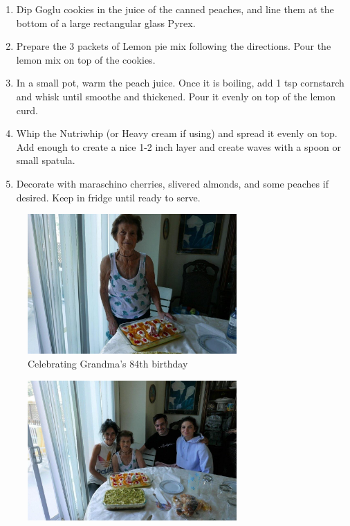 \begin{enumerate}
    \item Dip Goglu cookies in the juice of the canned peaches, and line them at the bottom of a large rectangular glass Pyrex.
    \item Prepare the 3 packets of Lemon pie mix following the directions. Pour the lemon mix on top of the cookies.
    \item In a small pot, warm the peach juice. Once it is boiling, add 1 tsp cornstarch and whisk until smoothe and thickened. Pour it evenly on top of the lemon curd.
    \item Whip the Nutriwhip (or Heavy cream if using) and spread it evenly on top. Add enough to create a nice 1-2 inch layer and create waves with a spoon or small spatula. 
    \item Decorate with maraschino cherries, slivered almonds, and some peaches if desired. Keep in fridge until ready to serve.
\end{enumerate}

\begin{figure}
  \includegraphics[width=80mm]{monanteras/images/Lemon cake.jpg}
    \caption{Celebrating Grandma's 84th birthday}
\end{figure}
\begin{figure}
  \includegraphics[width=80mm]{monanteras/images/Lemon cake 2.jpg}
\end{figure}
